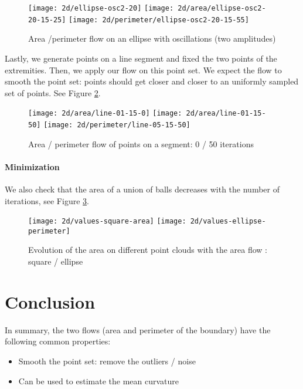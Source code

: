 \begin{figure}[h]
    \centering

    \texttt{[image: 2d/ellipse-osc2-20]}
    \texttt{[image: 2d/area/ellipse-osc2-20-15-25]}
    \texttt{[image: 2d/perimeter/ellipse-osc2-20-15-55]}
    \caption{Area /perimeter flow on an ellipse with oscillations (two
        amplitudes)}

    \label{fig:ellipse_osc2_flow}
\end{figure}


Lastly, we generate points on a line segment and fixed the two points of the
extremities. Then, we apply our flow on this point set. We expect the flow to
smooth the point set: points should get closer and closer to an uniformly
sampled set of points. See Figure \ref{fig:line_fixed_flow}.

\begin{figure}[h]
    \centering

    \texttt{[image: 2d/area/line-01-15-0]}
    \texttt{[image: 2d/area/line-01-15-50]}
    \texttt{[image: 2d/perimeter/line-05-15-50]}
    \caption{Area / perimeter flow of points on a segment: 0 / 50 iterations}

    \label{fig:line_fixed_flow}
\end{figure}

\paragraph{Minimization}

We also check that the area of a union of balls decreases with the number of
iterations, see Figure \ref{fig:area_time_decrease}.

\begin{figure}[h]
    \centering
    \texttt{[image: 2d/values-square-area]}
    \texttt{[image: 2d/values-ellipse-perimeter]}
    \caption{Evolution of the area on different point clouds with the area
        flow : square / ellipse}
    \label{fig:area_time_decrease}
\end{figure}

\section{Conclusion}

In summary, the two flows (area and perimeter of the boundary) have the
following common properties:
\begin{itemize}
    \item Smooth the point set: remove the outliers / noise
    \item Can be used to estimate the mean curvature
\end{itemize}

